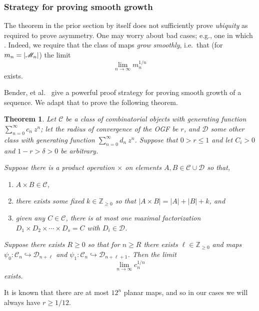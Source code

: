 \documentclass[amsmath,longbibliography,secnumarabic,floatfix,amssymb,nofootinbib,nobibnotes,letterpaper,11pt,notitlepage,tightenlines]{revtex4-1}
\newcommand{\Z}{\mathbb{Z}} \newcommand{\N}{\mathbb{N}}
\newcommand{\ArbClass}{\mathscr{C}}
\newcommand{\ArbSubClass}{\mathscr{D}}
\newcommand{\arbsubclass}{d}
\newcommand{\arbclass}{c}
\newtheorem{theorem}{Theorem}
\begin{document}
\subsubsection{Strategy for proving smooth growth}
\label{sec:smoothstratproof}

The theorem in the prior section by itself does not sufficiently prove \emph{ubiquity} as required
to prove asymmetry. One may worry about bad cases; e.g., one in which . Indeed, we require that the class of maps \emph{grow smoothly}, i.e.\ that (for
$m_n = |\mathscr{M}_n|$) the limit
\[ \lim_{n\to\infty}{m_n^{1/n}} \] exists.

Bender, et al.\ \cite{Bender1992104} give a powerful proof strategy for proving smooth growth of a
sequence. We adapt that to prove the following theorem.

\begin{theorem}
  Let $\ArbClass$ be a class of combinatorial objects with generating function
  $\sum_{n=0}^{\infty}{\arbclass_n~z^n}$; let the radius of convergence of the OGF be $r$, and
  $\ArbSubClass$ some other class with generating function
  $\sum_{n=0}^{\infty}{\arbsubclass_n~z^n}$. Suppose that $0 > r \le 1$ and let $C_i > 0$ and
  $1-r>\delta>0$ be arbitrary.

  Suppose there is a product operation $\times$ on elements $A, B \in
  \ArbClass \cup \ArbSubClass$ so that,
  \begin{enumerate}
  \item $A \times B \in \ArbClass$,
  \item there exists some fixed $k \in \Z_{\ge 0}$ so that $|A \times B| = |A| + |B| + k$, and
  \item given any $C \in \ArbClass$, there is at most one maximal factorization $D_1 \times D_2 \times
    \cdots \times D_s = C$ with $D_i \in \ArbSubClass$.
  \end{enumerate}
  Suppose there exists $R \ge 0$ so that for $n \ge R$ there exists $\ell \in \Z_{\ge 0}$ and maps $\psi_0:
  \ArbClass_n \hookrightarrow \ArbSubClass_{n+\ell}$ and $ \psi_1: \ArbClass_n \hookrightarrow
  \ArbSubClass_{n+\ell+1}$. Then the limit
  \[ \lim_{n\to\infty}{\arbclass_n^{1/n}} \] exists.
\end{theorem}

It is known that there are at most $12^n$ planar maps, and so in our cases we will always have $r
\ge 1/12$.
\end{document}
